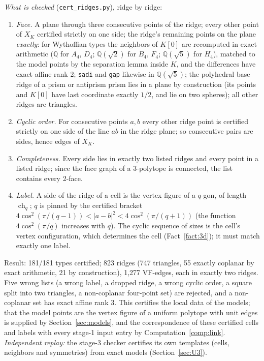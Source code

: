 \documentclass[11pt]{article}
\theoremstyle{definition}
\theoremstyle{remark}
\newcommand{\Q}{\mathbb{Q}}
\newcommand{\ch}{\operatorname{ch}}
\begin{document}
\noindent\emph{What is checked} (\texttt{cert\_ridges.py}), ridge by
ridge:
\begin{enumerate}[leftmargin=2em]
\item \emph{Face.} A plane through three consecutive points of the ridge;
  every other point of $X_K$ certified strictly on one side; the ridge's
  remaining points on the plane \emph{exactly}: for Wythoffian types the
  neighbors of $K[0]$ are recomputed in exact arithmetic ($\Q$ for $A_4$,
  $D_4$; $\Q(\sqrt2)$ for $B_4$, $F_4$; $\Q(\sqrt5)$ for $H_4$), matched to
  the model points by the separation lemma inside $K$, and the differences
  have exact affine rank 2; \texttt{sadi} and \texttt{gap} likewise in
  $\Q(\sqrt5)$; the polyhedral base ridge of a prism or antiprism prism lies
  in a plane by construction (its points and $K[0]$ have last coordinate
  exactly $1/2$, and lie on two spheres); all other ridges are triangles.
\item \emph{Cyclic order.} For consecutive points $a,b$ every other ridge
  point is certified strictly on one side of the line $ab$ in the ridge
  plane; so consecutive pairs are sides, hence edges of $X_K$.
\item \emph{Completeness.} Every side lies in exactly two listed ridges and
  every point in a listed ridge; since the face graph of a 3-polytope is
  connected, the list contains every 2-face.
\item \emph{Label.} A side of the ridge of a cell is the vertex figure of a
  $q$-gon, of length $\ch_q$; $q$ is pinned by the certified bracket
  $4\cos^2(\pi/(q-1))<|a-b|^2<4\cos^2(\pi/(q+1))$ (the function
  $4\cos^2(\pi/q)$ increases with $q$). The cyclic sequence of sizes is the
  cell's vertex configuration, which determines the cell
  (Fact~\ref{fact:3d}); it must match exactly one label.
\end{enumerate}
Result: 181/181 types certified; 823 ridges (747 triangles, 55 exactly
coplanar by exact arithmetic, 21 by construction), 1,277 VF-edges, each in
exactly two ridges. Five wrong
lists (a wrong label, a dropped ridge, a wrong cyclic order, a square split
into two triangles, a non-coplanar four-point set) are rejected, and a
non-coplanar set has exact affine rank 3.
This certifies the local data of the models; that the model points are the
vertex figure of a uniform polytope with unit edges is supplied by
Section~\ref{sec:models}, and the correspondence of these certified cells
and labels with every stage-1 input entry by Computation~\ref{comp:link}.
\emph{Independent replay:} the stage-3 checker certifies its own templates
(cells, neighbors and symmetries) from exact models
(Section~\ref{sec:U3}).
\end{document}
